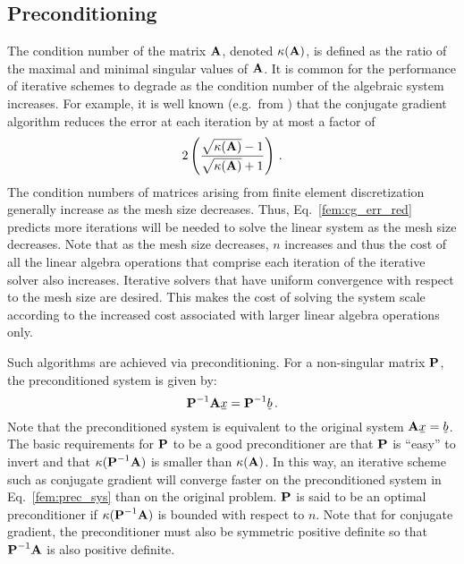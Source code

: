\documentclass[../doc.tex]{subfiles}
\begin{document}
\subsection{Preconditioning}
The condition number of the matrix $\boldsymbol{\mathrm{A}}$, denoted $\kappa(\boldsymbol{\mathrm{A}})$, is defined as the ratio of the maximal and minimal singular values of $\boldsymbol{\mathrm{A}}$. 
It is common for the performance of iterative schemes to degrade as the condition number of the algebraic system increases. 
For example, it is well known (e.g.~from \textcite[\S 2.4.2]{quateroni}) that the conjugate gradient algorithm reduces the error at each iteration by at most a factor of  
	\begin{equation} \label{fem:cg_err_red}
		2\left( \frac{\sqrt{\kappa(\boldsymbol{\mathrm{A}})} - 1}{\sqrt{\kappa(\boldsymbol{\mathrm{A}})} + 1} \right) \,. 
	\end{equation}
The condition numbers of matrices arising from finite element discretization generally increase as the mesh size decreases. Thus, Eq.~\ref{fem:cg_err_red} predicts more iterations will be needed to solve the linear system as the mesh size decreases. Note that as the mesh size decreases, $n$ increases and thus the cost of all the linear algebra operations that comprise each iteration of the iterative solver also increases. 
Iterative solvers that have uniform convergence with respect to the mesh size are desired. 
This makes the cost of solving the system scale according to the increased cost associated with larger linear algebra operations only. 

Such algorithms are achieved via preconditioning. For a non-singular matrix $\boldsymbol{\mathrm{P}}$, the preconditioned system is given by: 
	\begin{equation} \label{fem:prec_sys}
		\mat{P}^{-1} \mat{A} \ubar{x} = \mat{P}^{-1} \ubar{b} \,.
	\end{equation}
Note that the preconditioned system is equivalent to the original system $\mat{A}\ubar{x} = \ubar{b}$. The basic requirements for $\boldsymbol{\mathrm{P}}$ to be a good preconditioner are that $\boldsymbol{\mathrm{P}}$ is ``easy'' to invert and that $\kappa(\boldsymbol{\mathrm{P}}^{-1}\boldsymbol{\mathrm{A}})$ is smaller than $\kappa(\boldsymbol{\mathrm{A}})$. In this way, an iterative scheme such as conjugate gradient will converge faster on the preconditioned system in Eq.~\ref{fem:prec_sys} than on the original problem. $\boldsymbol{\mathrm{P}}$ is said to be an optimal preconditioner if $\kappa(\boldsymbol{\mathrm{P}}^{-1}\boldsymbol{\mathrm{A}})$ is bounded with respect to $n$. Note that for conjugate gradient, the preconditioner must also be symmetric positive definite so that $\boldsymbol{\mathrm{P}}^{-1}\boldsymbol{\mathrm{A}}$ is also positive definite. 
\end{document}
